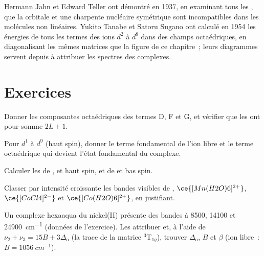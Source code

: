 \begin{history}
Hermann Jahn et Edward Teller ont démontré en 1937, en examinant tous les
, que la  orbitale et une charpente
nucléaire symétrique sont incompatibles dans les molécules non linéaires.
Yukito Tanabe et Satoru Sugano ont calculé en 1954 les énergies de tous
les termes des ions $d^2$ à $d^8$ dans des champs octaédriques, en
diagonalisant les mêmes matrices que la figure de ce chapitre~; leurs
diagrammes servent depuis à attribuer les spectres des complexes.
\end{history}

\section{Exercices}

\begin{exercise}[$\star$]\label{exo:b3:complex-spectra-magnetism:1}
Donner les composantes octaédriques des termes D, F et G, et vérifier que
les  ont pour somme $2L + 1$.
\end{exercise}

\begin{exercise}[$\star$]\label{exo:b3:complex-spectra-magnetism:2}
Pour $d^1$ à $d^9$ (haut spin), donner le terme fondamental de l'ion libre
et le terme octaédrique qui devient l'état fondamental du complexe.
\end{exercise}

\begin{exercise}[$\star$]\label{exo:b3:complex-spectra-magnetism:3}
Calculer les  de ,  et
 haut spin, et de  et  bas spin.
\end{exercise}

\begin{exercise}[$\star$]\label{exo:b3:complex-spectra-magnetism:4}
Classer par intensité croissante les bandes visibles de , $\ce{[Mn(H2O)6]^{2+}}$, $\ce{[CoCl4]^{2-}}$ et
$\ce{[Co(H2O)6]^{2+}}$, en justifiant.
\end{exercise}

\begin{exercise}[$\star\star$]\label{exo:b3:complex-spectra-magnetism:5}
Un complexe hexaaqua du nickel(II) présente des bandes à 8500, 14100 et
\qty{24900}{cm^{-1}} (données de l'exercice). Les attribuer et, à l'aide de
$\nu_2 + \nu_3 = 15B + 3\Delta_{\mathrm o}$ (la trace de la matrice $^3$T$_{1g}$),
trouver $\Delta_{\mathrm o}$, $B$ et $\beta$ (ion libre~: $B = \qty{1056}{cm^{-1}}$).
\end{exercise}

